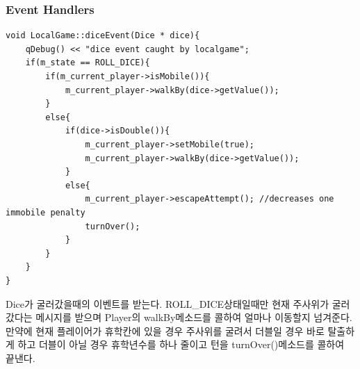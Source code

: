 \documentclass[10pt,oneside,a4paper,titlepage]{article}
\begin{document}
\subsubsection{Event Handlers} 

\begin{lstlisting}[frame=single,caption=
{LocalGame diceEvent},label=code:FD,captionpos=b,framexleftmargin=10pt,escapeinside=~~]
void LocalGame::diceEvent(Dice * dice){
    qDebug() << "dice event caught by localgame";
    if(m_state == ROLL_DICE){
        if(m_current_player->isMobile()){
            m_current_player->walkBy(dice->getValue());
        }
        else{
            if(dice->isDouble()){
                m_current_player->setMobile(true);
                m_current_player->walkBy(dice->getValue());
            }
            else{
                m_current_player->escapeAttempt(); //decreases one immobile penalty
                turnOver();
            }
        }
    }
}
\end{lstlisting}

Dice가 굴러갔을때의 이벤트를 받는다. ROLL\_DICE상태일때만 현재 주사위가 굴러갔다는 메시지를 받으며 Player의 walkBy메소드를 콜하여 얼마나 이동할지 넘겨준다. 만약에 현재 플레이어가 휴학칸에 있을 경우 주사위를 굴려서 더블일 경우 바로 탈출하게 하고 더블이 아닐 경우 휴학년수를 하나 줄이고 턴을 turnOver()메소드를 콜하여 끝낸다. \\
\end{document}
